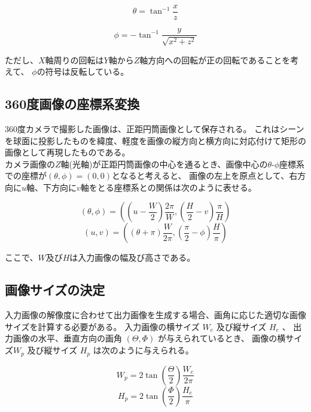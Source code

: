 \documentclass[]{jarticle}          %
\begin{document}
\begin{equation}
  \theta = \tan^{-1}\frac{x}{z}
  \label{eq10}
\end{equation}

\begin{equation}
  \phi = -\tan^{-1}\frac{y}{\sqrt{x^{2}+z^{2}}}
  \label{eq11}
\end{equation}

ただし、${X}$軸周りの回転は${Y}$軸から${Z}$軸方向への回転が正の回転であることを考えて、
${\phi}$の符号は反転している。

\subsection{360度画像の座標系変換}
360度カメラで撮影した画像は、正距円筒画像として保存される。
これはシーンを球面に投影したものを緯度、軽度を画像の縦方向と横方向に対応付けて矩形の画像として再現したものである。\\
カメラ画像の${Z}$軸(光軸)が正距円筒画像の中心を通るとき、画像中心の$\theta$-$\phi$座標系での座標が${(\theta,\phi)=(0,0)}$となると考えると、
画像の左上を原点として、右方向に${u}$軸、下方向に${v}$軸をとる座標系との関係は次のように表せる。

\begin{equation}
  (\theta,\phi)=((u-\frac{W}{2})\frac{2\pi}{W},(\frac{H}{2}-v)\frac{\pi}{H})
  \label{eq12}
\end{equation}
\begin{equation}
  (u,v)=((\theta+\pi)\frac{W}{2\pi},(\frac{\pi}{2}-\phi)\frac{H}{\pi})
  \label{eq13}
\end{equation}

ここで、$W$及び$H$は入力画像の幅及び高さである。

\subsection{画像サイズの決定}
入力画像の解像度に合わせて出力画像を生成する場合、画角に応じた適切な画像サイズを計算する必要がある。
入力画像の横サイズ $W_{e}$ 及び縦サイズ $H_{e}$ 、
出力画像の水平、垂直方向の画角 $(\Theta,\Phi)$ が与えられているとき、
画像の横サイズ$W_{p}$ 及び縦サイズ $H_{p}$ は次のように与えられる。

\begin{equation}
  W_{p}=2\tan(\frac{\Theta}{2})\frac{W_{e}}{2\pi}
  \label{eq14}
\end{equation}
\begin{equation}
  H_{p}=2\tan(\frac{\Phi}{2})\frac{H_{e}}{\pi}
  \label{eq15}
\end{equation}
\end{document}
